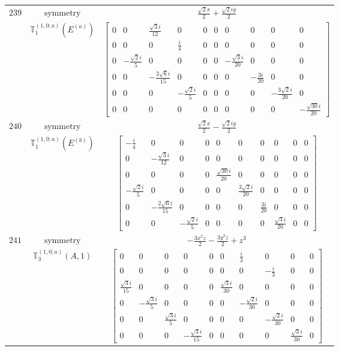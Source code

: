 \documentclass[fleqn,8pt,landscape]{jsarticle}
\begin{document}
\begin{longtable}{ccc}
$ 239 $ & $ \text{symmetry} $ & $ \frac{\sqrt{2} x}{2} + \frac{\sqrt{2} i y}{2} $ \\
$  $ & $ \mathbb{T}_{1}^{(1,0;a)}(E^{(a)}) $ & $ \begin{bmatrix} 0 & 0 & \frac{\sqrt{3} i}{12} & 0 & 0 & 0 & 0 & 0 & 0 & 0 \\ 0 & 0 & 0 & \frac{i}{4} & 0 & 0 & 0 & 0 & 0 & 0 \\ 0 & - \frac{\sqrt{2} i}{5} & 0 & 0 & 0 & 0 & - \frac{\sqrt{3} i}{20} & 0 & 0 & 0 \\ 0 & 0 & - \frac{2 \sqrt{6} i}{15} & 0 & 0 & 0 & 0 & - \frac{3 i}{20} & 0 & 0 \\ 0 & 0 & 0 & - \frac{\sqrt{2} i}{5} & 0 & 0 & 0 & 0 & - \frac{3 \sqrt{2} i}{20} & 0 \\ 0 & 0 & 0 & 0 & 0 & 0 & 0 & 0 & 0 & - \frac{\sqrt{30} i}{20} \end{bmatrix} $ \\ \hline
$ 240 $ & $ \text{symmetry} $ & $ \frac{\sqrt{2} x}{2} - \frac{\sqrt{2} i y}{2} $ \\
$  $ & $ \mathbb{T}_{1}^{(1,0;a)}(E^{(b)}) $ & $ \begin{bmatrix} - \frac{i}{4} & 0 & 0 & 0 & 0 & 0 & 0 & 0 & 0 & 0 \\ 0 & - \frac{\sqrt{3} i}{12} & 0 & 0 & 0 & 0 & 0 & 0 & 0 & 0 \\ 0 & 0 & 0 & 0 & \frac{\sqrt{30} i}{20} & 0 & 0 & 0 & 0 & 0 \\ - \frac{\sqrt{2} i}{5} & 0 & 0 & 0 & 0 & \frac{3 \sqrt{2} i}{20} & 0 & 0 & 0 & 0 \\ 0 & - \frac{2 \sqrt{6} i}{15} & 0 & 0 & 0 & 0 & \frac{3 i}{20} & 0 & 0 & 0 \\ 0 & 0 & - \frac{\sqrt{2} i}{5} & 0 & 0 & 0 & 0 & \frac{\sqrt{3} i}{20} & 0 & 0 \end{bmatrix} $ \\ \hline
$ 241 $ & $ \text{symmetry} $ & $ - \frac{3 x^{2} z}{2} - \frac{3 y^{2} z}{2} + z^{3} $ \\
$  $ & $ \mathbb{T}_{3}^{(1,0;a)}(A,1) $ & $ \begin{bmatrix} 0 & 0 & 0 & 0 & 0 & 0 & \frac{i}{3} & 0 & 0 & 0 \\ 0 & 0 & 0 & 0 & 0 & 0 & 0 & - \frac{i}{3} & 0 & 0 \\ \frac{\sqrt{3} i}{15} & 0 & 0 & 0 & 0 & \frac{\sqrt{3} i}{30} & 0 & 0 & 0 & 0 \\ 0 & - \frac{\sqrt{3} i}{5} & 0 & 0 & 0 & 0 & - \frac{\sqrt{2} i}{30} & 0 & 0 & 0 \\ 0 & 0 & \frac{\sqrt{3} i}{5} & 0 & 0 & 0 & 0 & - \frac{\sqrt{2} i}{30} & 0 & 0 \\ 0 & 0 & 0 & - \frac{\sqrt{3} i}{15} & 0 & 0 & 0 & 0 & \frac{\sqrt{3} i}{30} & 0 \end{bmatrix} $ \\ \hline

\end{longtable}
\end{document}
